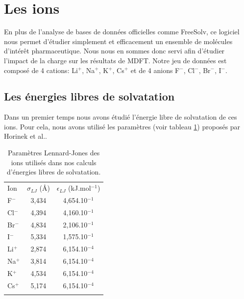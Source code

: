 




\section{Les ions}
En plus de l'analyse de bases de données officielles comme FreeSolv, ce logiciel nous permet d'étudier simplement et efficacement un ensemble de molécules d’intérêt pharmaceutique. Nous nous en sommes donc servi afin d'étudier l'impact de la charge sur les résultats de MDFT. Notre jeu de données est composé de 4 cations: Li$^+$, Na$^+$, K$^+$, Cs$^+$ et de 4 anions F$^-$, Cl$^-$, Br$^-$, I$^-$.

\subsection{Les énergies libres de solvatation}
Dans un premier temps nous avons étudié l'énergie libre de solvatation de ces ions. Pour cela, nous avons utilisé les paramètres (voir tableau \ref{tab:param_lj_horinek}) proposés par Horinek et al.\cite{Horinek_rational_2009}.

\begin{table}[ht]
  \centering
  \begin{tabular}{l c c}
   \hline & \\[-1em]\hline
    Ion    & $\sigma_{LJ}$ (\AA) & $\epsilon_{LJ}$ (kJ.mol$^{-1}$) \\
    \hline
      F$^-$	 & 3,434 & 4,654.10$^{-1}$ \\
      Cl$^-$ & 4,394 & 4,160.10$^{-1}$ \\
      Br$^-$ & 4,834 & 2,106.10$^{-1}$ \\
      I$^-$  & 5,334 & 1,575.10$^{-1}$ \\
      Li$^+$ & 2,874 & 6,154.10$^{-4}$ \\
      Na$^+$ & 3,814 & 6,154.10$^{-4}$ \\
      K$^+$  & 4,534 & 6,154.10$^{-4}$ \\
      Cs$^+$ & 5,174 & 6,154.10$^{-4}$ \\
    \hline & \\[-1em]\hline
  \end{tabular}
  \caption{Paramètres Lennard-Jones des ions utilisés dans nos calculs d'énergies libres de solvatation.}
  \label{tab:param_lj_horinek}  
\end{table}

